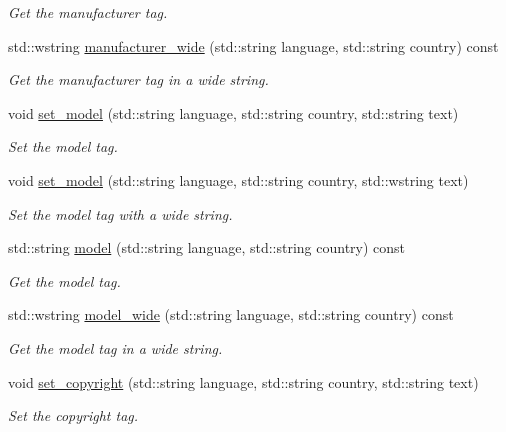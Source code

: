 \begin{DoxyCompactItemize}
\begin{DoxyCompactList}\small\item\em Get the manufacturer tag. \end{DoxyCompactList}\item 
std\+::wstring \hyperlink{class_c_m_s_1_1_profile_adabc31854f8bad3fff001bf1c368f578}{manufacturer\+\_\+wide} (std\+::string language, std\+::string country) const
\begin{DoxyCompactList}\small\item\em Get the manufacturer tag in a wide string. \end{DoxyCompactList}\item 
void \hyperlink{class_c_m_s_1_1_profile_a3eac2ae4b39f826f173ea3d6d6fbebd0}{set\+\_\+model} (std\+::string language, std\+::string country, std\+::string text)
\begin{DoxyCompactList}\small\item\em Set the model tag. \end{DoxyCompactList}\item 
void \hyperlink{class_c_m_s_1_1_profile_a9cf62798d019c1337df37e52b4b84e5a}{set\+\_\+model} (std\+::string language, std\+::string country, std\+::wstring text)
\begin{DoxyCompactList}\small\item\em Set the model tag with a wide string. \end{DoxyCompactList}\item 
std\+::string \hyperlink{class_c_m_s_1_1_profile_a53625142c46b1ae35c5273bd9221b4c5}{model} (std\+::string language, std\+::string country) const
\begin{DoxyCompactList}\small\item\em Get the model tag. \end{DoxyCompactList}\item 
std\+::wstring \hyperlink{class_c_m_s_1_1_profile_abc14007394d919335db466432570c569}{model\+\_\+wide} (std\+::string language, std\+::string country) const
\begin{DoxyCompactList}\small\item\em Get the model tag in a wide string. \end{DoxyCompactList}\item 
void \hyperlink{class_c_m_s_1_1_profile_a24a888e60c03f7e8e556cd3aca5e65ec}{set\+\_\+copyright} (std\+::string language, std\+::string country, std\+::string text)
\begin{DoxyCompactList}\small\item\em Set the copyright tag. \end{DoxyCompactList}\item 

\end{DoxyCompactItemize}
